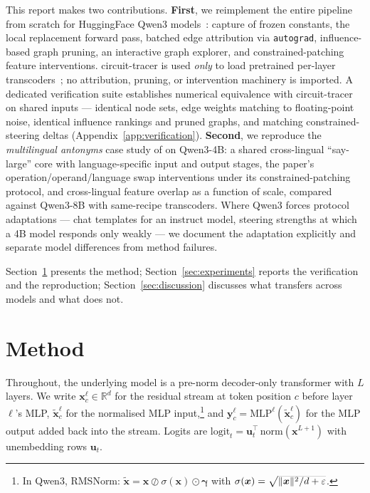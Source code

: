 \documentclass[11pt,a4paper]{article}
\begin{document}
This report makes two contributions. \textbf{First}, we reimplement the entire
pipeline from scratch for HuggingFace Qwen3 models~\citep{yang2025qwen3}: capture of
frozen constants, the local replacement forward pass, batched edge attribution via
\texttt{autograd}, influence-based graph pruning, an interactive graph explorer, and
constrained-patching feature interventions. circuit-tracer is used \emph{only} to load
pretrained per-layer transcoders~\citep{hanna2025qwen3tc}; no attribution, pruning, or
intervention machinery is imported. A dedicated verification suite establishes
numerical equivalence with circuit-tracer on shared inputs --- identical node sets,
edge weights matching to floating-point noise, identical influence rankings and pruned
graphs, and matching constrained-steering deltas (Appendix~\ref{app:verification}). \textbf{Second},
we reproduce the \emph{multilingual antonyms} case study of
\citet{lindsey2025biology} on Qwen3-4B: a shared cross-lingual ``say-large'' core with
language-specific input and output stages, the paper's operation/operand/language swap
interventions under its constrained-patching protocol, and cross-lingual feature
overlap as a function of scale, compared against Qwen3-8B with same-recipe
transcoders. Where Qwen3 forces protocol adaptations --- chat templates for an
instruct model, steering strengths at which a 4B model responds only weakly --- we
document the adaptation explicitly and separate model differences from method
failures.

Section~\ref{sec:method} presents the method; Section~\ref{sec:experiments} reports
the verification and the reproduction; Section~\ref{sec:discussion} discusses
what transfers across models and what does not.

\section{Method}\label{sec:method}

Throughout, the underlying model is a pre-norm decoder-only transformer with $L$
layers. We write $\bm{x}^{\ell}_{c}\in\mathbb{R}^{d}$ for the residual stream at token
position $c$ before layer $\ell$'s MLP, $\tilde{\bm{x}}^{\ell}_{c}$ for the normalised
MLP input,\footnote{In Qwen3, RMSNorm: $\tilde{\bm{x}} = \bm{x} \oslash
\sigma(\bm{x})\odot\bm{\gamma}$ with $\sigma(\bm{x})=\smash{\sqrt{\lVert \bm{x}
\rVert^2/d+\varepsilon}}$.} and $\bm{y}^{\ell}_{c}=\mathrm{MLP}^{\ell}(\tilde{\bm{x}}^{\ell}_{c})$
for the MLP output added back into the stream. Logits are
$\mathrm{logit}_{t} = \bm{u}_{t}^{\top}\,\mathrm{norm}(\bm{x}^{L+1})$ with unembedding
rows $\bm{u}_{t}$.
\end{document}
